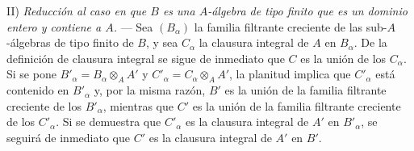 II) \emph{Reducción al caso en que $B$ es una $A$-álgebra de tipo
finito que es un dominio entero y contiene a $A$.} --- Sea
$(B_\alpha)$ la familia filtrante creciente de las sub-$A$-álgebras
de tipo finito de $B$, y sea $C_\alpha$ la clausura
integral de $A$ en $B_\alpha$. De la definición de clausura integral se sigue de
inmediato que $C$ es la unión de los $C_\alpha$. Si se pone
$B'_\alpha=B_\alpha\otimes_A A'$ y
$C'_\alpha=C_\alpha\otimes_A A'$, la planitud implica que
$C'_\alpha$ está contenido en $B'_\alpha$ y, por la misma razón,
$B'$ es la unión de la familia filtrante creciente de los
$B'_\alpha$, mientras que $C'$ es la unión de la familia filtrante
creciente de los $C'_\alpha$. Si se demuestra que $C'_\alpha$ es la
clausura integral de $A'$ en $B'_\alpha$, se seguirá de inmediato
que $C'$ es la clausura integral de $A'$ en $B'$.
